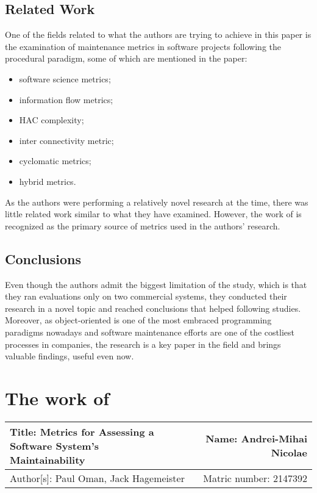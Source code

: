 \documentclass[a4paper,portrait,12pt]{article}
\begin{document}
\subsection{Related Work}
One of the fields related to what the authors are trying to achieve in this
paper is the examination of maintenance metrics in software projects following
the procedural paradigm, some of which are mentioned in the paper:
 \begin{itemize}
  \item \citet{halstead1977elements} software science metrics;
  \item \citet{henry1981software} information flow metrics;
  \item \citet{bail1988program} HAC complexity;
  \item \citet{robillard1989interconnectivity} inter connectivity metric;
  \item \citet{mccabe1976complexity} cyclomatic metrics;
  \item \citet{adamov1990proposal} hybrid metrics.
 \end{itemize}
As the authors were performing a relatively novel research at the time, 
there was little related work similar to what they have examined. However,
the work of \citet{chidamber1994metrics} is recognized as the primary
source of metrics used in the authors' research.

\subsection{Conclusions}
Even though the authors admit the biggest limitation of the study, which is
that they ran evaluations only on two commercial systems, they conducted their research
in a novel topic and reached conclusions that helped following studies. Moreover, 
as object-oriented is one of the most embraced programming paradigms nowadays and 
software maintenance efforts are one of the costliest processes in companies, the
research is a key paper in the field and brings valuable findings, useful even now.
 
\section{The work of \cite{oman1992metrics}}

 \begin{center}
   \begin{tabular}{ | l | r | }
    \hline
    \parbox[t]{5cm}{Title: Metrics for Assessing a Software System's
                    \\  Maintainability} 
     & Name: Andrei-Mihai Nicolae \\ 
     \hline
     Author[s]: Paul Oman, Jack Hagemeister & Matric number: 2147392 \\
    \hline
   \end{tabular}
 \end{center}
\end{document}
